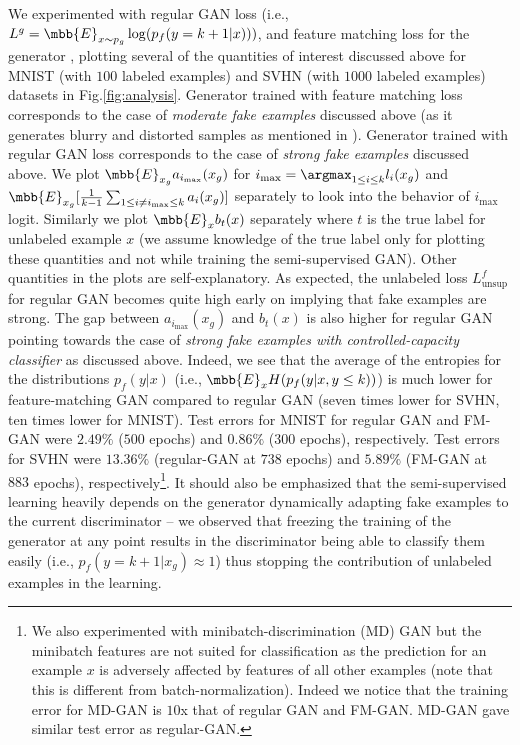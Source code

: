 \documentclass{article}
\begin{document}
We experimented with regular GAN loss (i.e., $L^g = \mbb{E}_{x\sim p_g} \log (p_f(y=k+1|x)))$, and feature matching loss for the generator \cite{salimans2016improved}, plotting  several of the quantities of interest discussed above for MNIST (with $100$ labeled examples) and SVHN (with $1000$ labeled examples) datasets in Fig.\ref{fig:analysis}. Generator trained with feature matching loss corresponds to the case of \emph{moderate fake examples} discussed above (as it generates blurry and distorted samples as mentioned in \cite{salimans2016improved}). Generator trained with regular GAN loss corresponds to the case of \emph{strong fake examples} discussed above. We plot $\mbb{E}_{x_g} a_{i_\text{max}}(x_g)$ for $i_\text{max}=\argmax_{1\leq i\leq k} l_i(x_g)$ and $\mbb{E}_{x_g} [\frac{1}{k-1}\sum_{1\leq i\neq i_\text{max}\leq k} a_{i}(x_g)]$ separately to look into the behavior of $i_\text{max}$ logit. Similarly we plot $\mbb{E}_{x} b_{t}(x)$ separately where $t$ is the true label for unlabeled example $x$ (we assume knowledge of the true label only for plotting these quantities and not while training the semi-supervised GAN). Other quantities in the plots are self-explanatory. As expected, the unlabeled loss $L^f_\text{unsup}$ for regular GAN becomes quite high early on implying that fake examples are strong. The gap between $a_{i_\text{max}}(x_g)$ and $b_t(x)$ is also higher for regular GAN pointing towards the case of \emph{strong fake examples with controlled-capacity classifier} as discussed above. Indeed, we see that the average of the entropies for the distributions $p_f(y|x)$ (i.e., $\mbb{E}_x H(p_f(y|x,y\leq k))$) is much lower for feature-matching GAN compared to regular GAN (seven times lower for SVHN, ten times lower for MNIST). Test errors for MNIST for regular GAN and FM-GAN were $2.49\%$  ($500$ epochs) and $0.86\%$ ($300$ epochs), respectively. Test errors for SVHN were $13.36\%$ (regular-GAN at $738$ epochs) and $5.89\%$ (FM-GAN at $883$ epochs), respectively\footnote{We also experimented with minibatch-discrimination (MD) GAN\cite{salimans2016improved} but the minibatch features are not suited for classification as the prediction for an example $x$ is adversely affected by features of all other examples (note that this is different from batch-normalization). Indeed we notice that the training error for MD-GAN is $10$x that of regular GAN and FM-GAN. MD-GAN gave similar test error as regular-GAN.}.  It should also be emphasized that the semi-supervised learning heavily depends on the generator dynamically adapting fake examples to the current discriminator -- we observed that freezing the training of the generator at any point results in the discriminator being able to classify them easily (i.e., $p_f(y=k+1|x_g)\approx 1$) thus stopping the contribution of unlabeled examples in the learning. 
\end{document}
